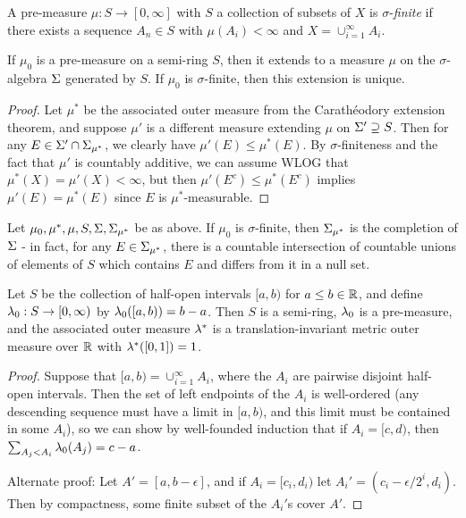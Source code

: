 \documentclass[letterpaper,11pt]{report}
\begin{document}
\begin{defn} A pre-measure $\mu : S \rightarrow [0,\infty]$ with $S$ a collection of subsets of $X$ is $\sigma$-\emph{finite} if there exists a sequence $A_n \in S$ with $\mu(A_i) < \infty$ and $X = \cup_{i=1}^\infty A_i$.
\end{defn}

\begin{thm} If $\mu_0$ is a pre-measure on a semi-ring $S$, then it extends to a measure $\mu$ on the $\sigma$-algebra $\Sigma$ generated by $S$. If $\mu_0$ is $\sigma$-finite, then this extension is unique.
\end{thm}
\begin{proof} Let $\mu^*$ be the associated outer measure from the Carath\'eodory extension theorem, and suppose $\mu'$ is a different measure extending $\mu$ on $\Sigma' \supseteq S$. Then for any $E \in \Sigma' \cap \Sigma_{\mu^*}$, we clearly have $\mu'(E) \le \mu^*(E)$. By $\sigma$-finiteness and the fact that $\mu'$ is countably additive, we can assume WLOG that $\mu^*(X) = \mu'(X) < \infty$, but then $\mu'(E^c) \le \mu^*(E^c)$ implies $\mu'(E) = \mu^*(E)$ since $E$ is $\mu^*$-measurable.
\end{proof}

\begin{prop} Let $\mu_0, \mu^*, \mu, S, \Sigma, \Sigma_{\mu^*}$ be as above. If $\mu_0$ is $\sigma$-finite, then $\Sigma_{\mu^*}$ is the completion of $\Sigma$ - in fact, for any $E \in \Sigma_{\mu^*}$, there is a countable intersection of countable unions of elements of $S$ which contains $E$ and differs from it in a null set.
\end{prop}

\begin{thm} Let $S$ be the collection of half-open intervals $[a,b)$ for $a \le b \in \mathbb{R}$, and define $\lambda_0 : S \rightarrow [0,\infty)$ by $\lambda_0([a,b)) = b-a$. Then $S$ is a semi-ring, $\lambda_0$ is a pre-measure, and the associated outer measure $\lambda^*$ is a translation-invariant metric outer measure over $\mathbb{R}$ with $\lambda^*([0,1]) = 1$.
\end{thm}
\begin{proof} Suppose that $[a,b) = \cup_{i=1}^\infty A_i$, where the $A_i$ are pairwise disjoint half-open intervals. Then the set of left endpoints of the $A_i$ is well-ordered (any descending sequence must have a limit in $[a,b)$, and this limit must be contained in some $A_i$), so we can show by well-founded induction that if $A_i = [c,d)$, then $\sum_{A_j < A_i} \lambda_0(A_j) = c-a$.

Alternate proof: Let $A' = [a,b-\epsilon]$, and if $A_i = [c_i,d_i)$ let $A_i' = (c_i - \epsilon/2^i, d_i)$. Then by compactness, some finite subset of the $A_i'$s cover $A'$.
\end{proof}
\end{document}
